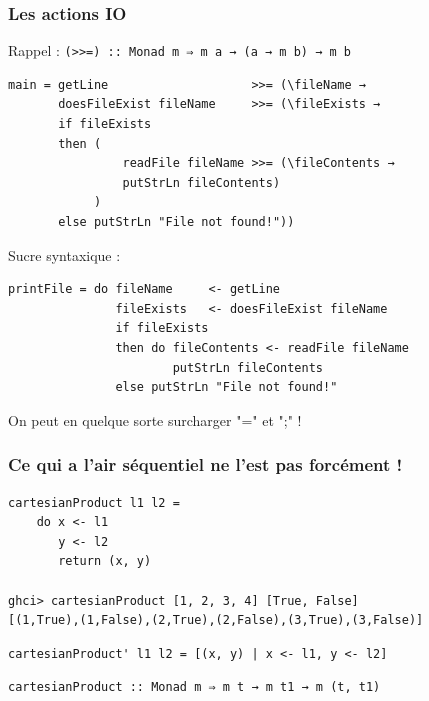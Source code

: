 \documentclass[10pt]{beamer}
\begin{document}
\begin{frame}[fragile]
\frametitle{Les actions IO}

Rappel : \verb|(>>=) :: Monad m ⇒ m a → (a → m b) → m b|

\begin{verbatim}
main = getLine                    >>= (\fileName →
       doesFileExist fileName     >>= (\fileExists →
       if fileExists
       then (
                readFile fileName >>= (\fileContents →
                putStrLn fileContents)
            )
       else putStrLn "File not found!"))
\end{verbatim}

\pause

Sucre syntaxique :

\begin{verbatim}
printFile = do fileName     <- getLine
               fileExists   <- doesFileExist fileName
               if fileExists
               then do fileContents <- readFile fileName
                       putStrLn fileContents
               else putStrLn "File not found!"
\end{verbatim}

On peut en quelque sorte surcharger "=" et ";" !

\end{frame}



\begin{frame}[fragile]
\frametitle{Ce qui a l'air séquentiel ne l'est pas forcément !}
\begin{verbatim}
cartesianProduct l1 l2 =
    do x <- l1
       y <- l2
       return (x, y)

ghci> cartesianProduct [1, 2, 3, 4] [True, False]
[(1,True),(1,False),(2,True),(2,False),(3,True),(3,False)]
\end{verbatim}

\pause

\begin{verbatim}
cartesianProduct' l1 l2 = [(x, y) | x <- l1, y <- l2]
\end{verbatim}

\pause

\begin{verbatim}
cartesianProduct :: Monad m ⇒ m t → m t1 → m (t, t1)
\end{verbatim}

\end{frame}
\end{document}
